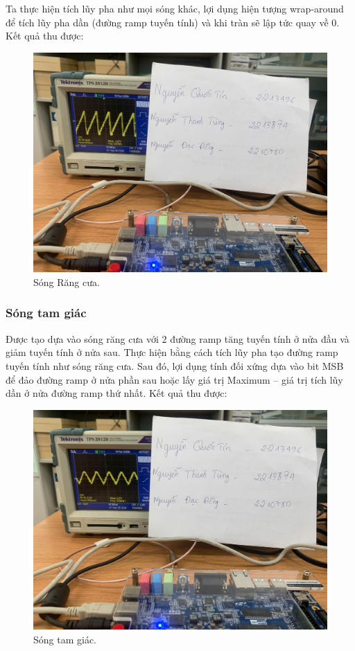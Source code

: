 Ta thực hiện tích lũy pha như mọi sóng khác, lợi dụng hiện tượng wrap-around để tích lũy pha dần (đường ramp tuyến tính) và khi tràn sẽ lập tức quay về 0. Kết quả thu được:

\begin{figure}[H]
	\centering
	\includegraphics[width=\linewidth]{./my-chapters/my-images/Gen_wave/hinh4.jpg}
	\caption{Sóng Răng cưa.}
	\label{f: sawtooth_wave}
\end{figure}

\subsubsection{Sóng tam giác}

Được tạo dựa vào sóng răng cưa với 2 đường ramp tăng tuyến tính ở nửa đầu và giảm tuyến tính ở nửa sau. Thực hiện bằng cách tích lũy pha tạo đường ramp tuyến tính như sóng răng cưa. Sau đó, lợi dụng tính đối xứng dựa vào bit MSB để đảo đường ramp ở nửa phần sau hoặc lấy giá trị Maximum – giá trị tích lũy dần ở nửa đường ramp thứ nhất. Kết quả thu được:

\begin{figure}[H]
	\centering
	\includegraphics[width=\linewidth]{./my-chapters/my-images/Gen_wave/hinh5.jpg}
	\caption{Sóng tam giác.}
	\label{f: triangle_wave}
\end{figure}

